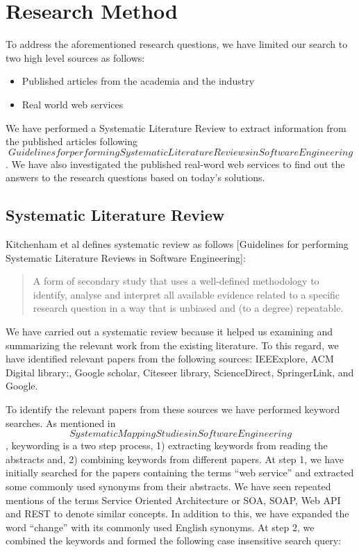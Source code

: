 \documentclass[runningheads,a4paper]{llncs}
\begin{document}
\section{Research Method} %
\label{sec:research_method}

To address the aforementioned research questions, we have limited our search to two high level sources as follows:

\begin{itemize}
  \item Published articles from the academia and the industry
  \item Real world web services
\end{itemize}

We have performed a Systematic Literature Review to extract information from the published articles following \[Guidelines for performing Systematic Literature Reviews in Software Engineering\]. We have also investigated the published real-word web services to find out the answers to the research questions based on today’s solutions.

\subsection{Systematic Literature Review} %
\label{sub:systematic_literature_review}
Kitchenham et al defines systematic review as follows [Guidelines for performing Systematic Literature Reviews in Software Engineering]:

\begin{quote}
A form of secondary study that uses a well-defined methodology to identify, analyse and interpret all available evidence related to a specific research question in a way that is unbiased and (to a degree) repeatable.
\end{quote}
We have carried out a systematic review because it helped us examining and summarizing the relevant work from the existing literature. To this regard, we have identified relevant papers from the following sources: IEEExplore, ACM Digital library:, Google scholar, Citeseer library, ScienceDirect, SpringerLink, and Google.

To identify the relevant papers from these sources we have performed keyword searches. As mentioned in \[Systematic Mapping Studies in Software Engineering\], keywording is a two step process, 1) extracting keywords from reading the abstracts and, 2) combining keywords from different papers. At step 1, we have initially searched for the papers containing the terms ``web service'' and extracted some commonly used synonyms from their abstracts. We have seen repeated mentions of the terms Service Oriented Architecture or SOA, SOAP, Web API and REST to denote similar concepts. In addition to this, we have expanded the word ``change'' with its commonly used English synonyms. At step 2, we combined the keywords and formed the following case insensitive search query:
\end{document}
